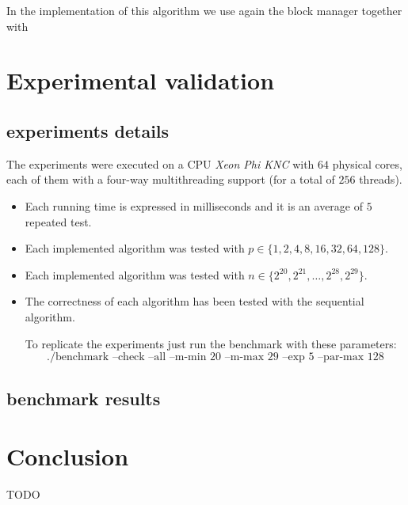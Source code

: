 \documentclass{article}
\begin{document}
In the implementation of this algorithm we use again the block manager together with

\section{Experimental validation}

\subsection{experiments details}

The experiments were executed on a CPU \textit{Xeon Phi KNC} with $64$ physical cores, each of them with a four-way multithreading support (for a total of $256$ threads).

\begin{itemize}
  \item Each running time is expressed in milliseconds and it is an average of $5$ repeated test.
  \item Each implemented algorithm was tested with $p \in \{1, 2, 4, 8, 16, 32, 64, 128\}$.
  \item Each implemented algorithm was tested with $n \in \{2^{20}, 2^{21}, \ldots, 2^{28}, 2^{29}\}$.
  \item The correctness of each algorithm has been tested with the sequential algorithm.
  
\smallskip

To replicate the experiments just run the benchmark with these parameters:
\begin{equation*}
  \text{./benchmark --check --all --m-min 20 --m-max 29 --exp 5 --par-max 128}
\end{equation*}

\end{itemize}

\subsection{benchmark results}


\section{Conclusion}

TODO

\end{document}
